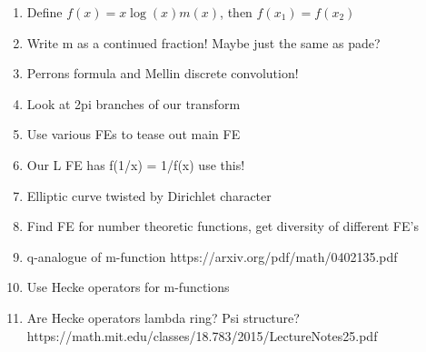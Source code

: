 \documentclass[a4paper]{amsart}
\begin{document}
\begin{enumerate}
  \item Define $f(x) = x\log(x)m(x)$, then $f(x_1) = f(x_2)$
  \item Write m as a continued fraction! Maybe just the same as pade?
  \item Perrons formula and Mellin discrete convolution!
  \item Look at 2pi branches of our transform
  \item Use various FEs to tease out main FE
  \item Our L FE has f(1/x) = 1/f(x) use this!
  \item Elliptic curve twisted by Dirichlet character
  \item Find FE for number theoretic functions, get diversity of different FE's 
  \item q-analogue of m-function https://arxiv.org/pdf/math/0402135.pdf
  \item Use Hecke operators for m-functions
  \item Are Hecke operators lambda ring? Psi structure? https://math.mit.edu/classes/18.783/2015/LectureNotes25.pdf

\end{enumerate}
\end{document}
